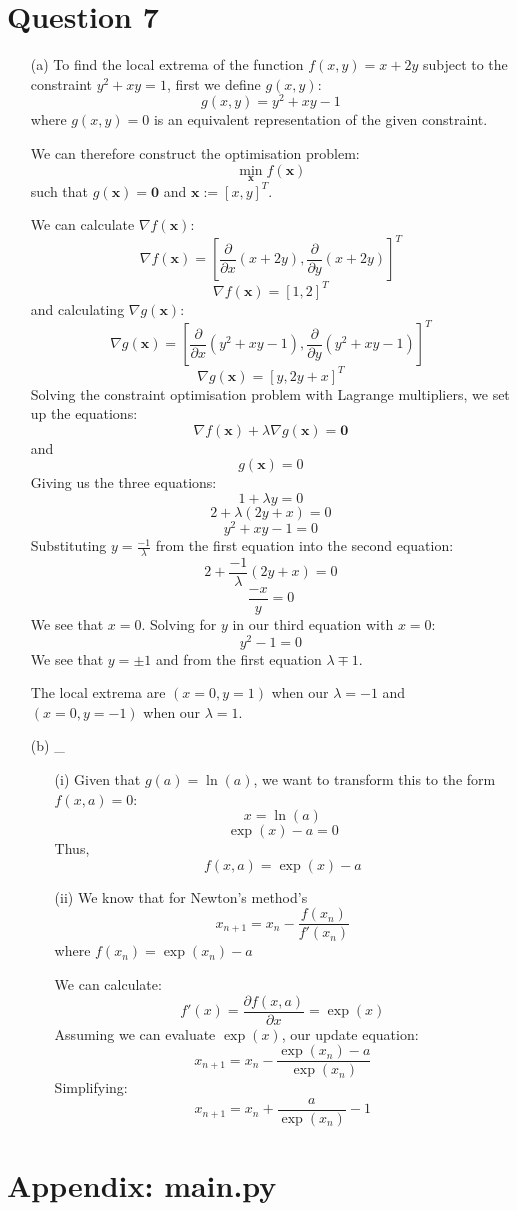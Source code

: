 \documentclass[12pt]{article}
\begin{document}
\section*{Question 7}
\begin{enumerate}
\item[(a)] To find the local extrema of the function $f(x,y) = x + 2y$ subject to the constraint $y^2 + xy = 1$, first we define $g(x, y)$:
$$g(x, y) = y^2 + xy - 1$$
where $g(x, y)=0$ is an equivalent representation of the given constraint.

We can therefore construct the optimisation problem:
$$\min_{\textbf{x}} f(\textbf{x})$$
such that $g(\textbf{x})=\textbf{0}$ and $\textbf{x} := [x, y]^T$.

We can calculate $\nabla f(\textbf{x})$:
$$\nabla f(\textbf{x}) = [\frac{\partial}{\partial x} (x+2y), \frac{\partial}{\partial y} (x+2y)]^T$$
$$\nabla f(\textbf{x}) = [1, 2]^T$$
and calculating $\nabla g(\textbf{x})$:
$$\nabla g(\textbf{x}) = [\frac{\partial}{\partial x} (y^2 + xy - 1), \frac{\partial}{\partial y} (y^2 + xy - 1)]^T$$
$$\nabla g(\textbf{x}) = [y, 2y+x]^T$$
Solving the constraint optimisation problem with Lagrange multipliers, we set up the equations:
$$\nabla f(\textbf{x})+\lambda \nabla g(\textbf{x}) = \textbf{0}$$
and
$$g(\textbf{x}) = 0$$
Giving us the three equations:
$$1+\lambda y = 0$$
$$2+\lambda (2y+x)= 0$$
$$y^2 + xy - 1 = 0$$
Substituting $ y = \frac{-1}{\lambda}$ from the first equation into the second equation:
$$2+\frac{-1}{\lambda}(2y+x) = 0$$
$$\frac{-x}{y} = 0$$
We see that $x=0$.
Solving for $y$ in our third equation with $x=0$:
$$y^2-1=0$$
We see that $y=\pm 1$ and from the first equation $\lambda\mp 1$.

The local extrema are $(x=0, y=1)$ when our $\lambda=-1$ and $(x=0, y=-1)$ when our $\lambda=1$.

\item[(b)] _
\begin{enumerate}
             \item[(i)] Given that $g(a) = \ln(a)$, we want to transform this to the form $f(x,a)=0$:
             $$x = \ln(a)$$
             $$\exp(x) - a = 0$$
             Thus,
             $$f(x, a) = \exp(x) - a$$
  \item[(ii)] We know that for Newton's method's
             $$x_{n+1} = x_{n} - \frac{f(x_n)}{f'(x_n)}$$
             where $f(x_n) = \exp(x_n) - a$

             We can calculate:
             $$f'(x) = \frac{\partial f(x, a)}{\partial x}= \exp(x)$$
             Assuming we can evaluate $\exp(x)$, our update equation:
             $$x_{n+1} = x_{n} - \frac{\exp(x_n) - a}{\exp(x_n)}$$
             Simplifying:
             $$x_{n+1} = x_{n} + \frac{a}{\exp(x_n)} - 1$$
\end{enumerate}


\end{enumerate}
\newpage
\section*{Appendix: main.py}

\end{document}
